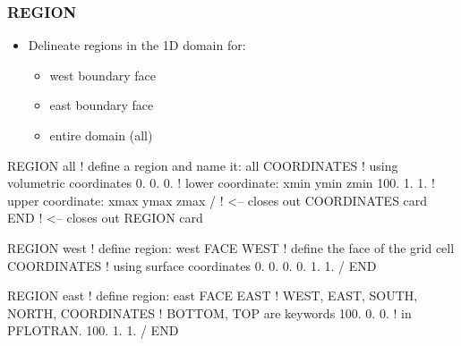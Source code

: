 \documentclass{beamer}
\newcommand\redcomment[1]{{{\color{red} #1}}}
\newcommand\bluecomment[1]{{{\color{blue} #1}}}
\newcommand\greencomment[1]{{{\color{green} #1}}}
\begin{document}
\begin{frame}\frametitle{REGION}

\vspace{1 cm}
\begin{itemize}
  \item Delineate regions in the 1D domain for:
  \begin{itemize}
    \item west boundary face
    \item east boundary face
    \item entire domain (all)
  \end{itemize}
\end{itemize}

\begin{semiverbatim}

REGION all            \bluecomment{! define a region and name it: \greencomment{all}}
  COORDINATES         \bluecomment{! using \redcomment{volumetric} coordinates}
    0. 0. 0.          \bluecomment{! lower coordinate: xmin ymin zmin}
    100. 1. 1.        \bluecomment{! upper coordinate: xmax ymax zmax}
  /   \bluecomment{! <-- closes out COORDINATES card}
END   \bluecomment{! <-- closes out REGION card}

\newpage
REGION west           \bluecomment{! define region:} \greencomment{west}
  FACE WEST           \bluecomment{! define the face of the grid cell}
  COORDINATES         \bluecomment{! using \redcomment{surface} coordinates}
    0. 0. 0.
    0. 1. 1.
  /
END

REGION east           \bluecomment{! define region:} \greencomment{east}
  FACE EAST           \redcomment{! WEST, EAST, SOUTH, NORTH,}
  COORDINATES         \redcomment{!   BOTTOM, TOP} \bluecomment{ are keywords}
    100. 0. 0.        \bluecomment{!   in PFLOTRAN.}
    100. 1. 1.
  /
END

\end{semiverbatim}

\end{frame}
\end{document}
